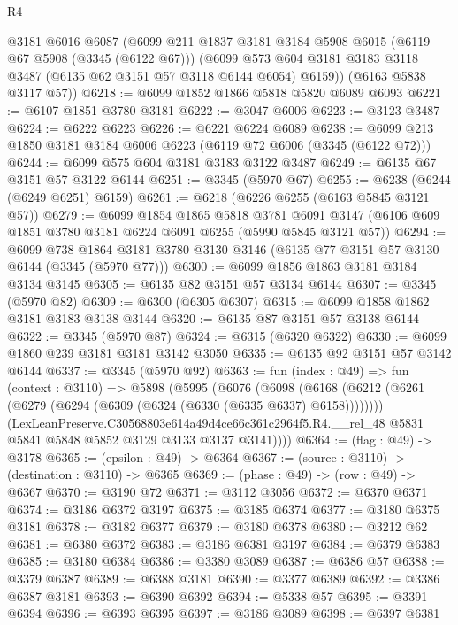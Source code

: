 \begin{lexlean}{R4}
\begin{coremodule}
      @3181
      @6016
      @6087
      (@6099
        @211
        @1837
        @3181
        @3184
        @5908
        @6015
        (@6119 @67 @5908 (@3345 (@6122 @67)))
        (@6099 @573 @604 @3181 @3183 @3118 @3487 (@6135 @62 @3151 @57 @3118 @6144 @6054) @6159))
      (@6163 @5838 @3117 @57))
@6218 := @6099 @1852 @1866 @5818 @5820 @6089 @6093
@6221 := @6107 @1851 @3780 @3181
@6222 := @3047 @6006
@6223 := @3123 @3487
@6224 := @6222 @6223
@6226 := @6221 @6224 @6089
@6238 := @6099 @213 @1850 @3181 @3184 @6006 @6223 (@6119 @72 @6006 (@3345 (@6122 @72)))
@6244 := @6099 @575 @604 @3181 @3183 @3122 @3487
@6249 := @6135 @67 @3151 @57 @3122 @6144
@6251 := @3345 (@5970 @67)
@6255 := @6238 (@6244 (@6249 @6251) @6159)
@6261 := @6218 (@6226 @6255 (@6163 @5845 @3121 @57))
@6279 := @6099
    @1854
    @1865
    @5818
    @3781
    @6091
    @3147
    (@6106 @609 @1851 @3780 @3181 @6224 @6091 @6255 (@5990 @5845 @3121 @57))
@6294 := @6099
    @738
    @1864
    @3181
    @3780
    @3130
    @3146
    (@6135 @77 @3151 @57 @3130 @6144 (@3345 (@5970 @77)))
@6300 := @6099 @1856 @1863 @3181 @3184 @3134 @3145
@6305 := @6135 @82 @3151 @57 @3134 @6144
@6307 := @3345 (@5970 @82)
@6309 := @6300 (@6305 @6307)
@6315 := @6099 @1858 @1862 @3181 @3183 @3138 @3144
@6320 := @6135 @87 @3151 @57 @3138 @6144
@6322 := @3345 (@5970 @87)
@6324 := @6315 (@6320 @6322)
@6330 := @6099 @1860 @239 @3181 @3181 @3142 @3050
@6335 := @6135 @92 @3151 @57 @3142 @6144
@6337 := @3345 (@5970 @92)
@6363 := fun (index : @49) =>
  fun (context : @3110) =>
  @5898
    (@5995
      (@6076
        (@6098
          (@6168 (@6212 (@6261 (@6279 (@6294 (@6309 (@6324 (@6330 (@6335 @6337) @6158))))))))
          (LexLeanPreserve.C30568803e614a49d4ce66c361c2964f5.R4.__rel_48
            @5831
            @5841
            @5848
            @5852
            @3129
            @3133
            @3137
            @3141))))
@6364 := (flag : @49) -> @3178
@6365 := (epsilon : @49) -> @6364
@6367 := (source : @3110) -> (destination : @3110) -> @6365
@6369 := (phase : @49) -> (row : @49) -> @6367
@6370 := @3190 @72
@6371 := @3112 @3056
@6372 := @6370 @6371
@6374 := @3186 @6372 @3197
@6375 := @3185 @6374
@6377 := @3180 @6375 @3181
@6378 := @3182 @6377
@6379 := @3180 @6378
@6380 := @3212 @62
@6381 := @6380 @6372
@6383 := @3186 @6381 @3197
@6384 := @6379 @6383
@6385 := @3180 @6384
@6386 := @3380 @3089
@6387 := @6386 @57
@6388 := @3379 @6387
@6389 := @6388 @3181
@6390 := @3377 @6389
@6392 := @3386 @6387 @3181
@6393 := @6390 @6392
@6394 := @5338 @57
@6395 := @3391 @6394
@6396 := @6393 @6395
@6397 := @3186 @3089
@6398 := @6397 @6381

\end{coremodule}
\end{lexlean}
